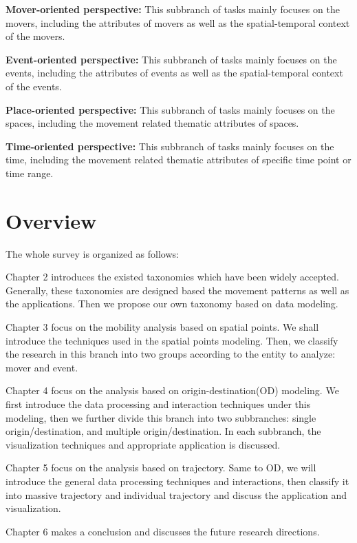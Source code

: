 \textbf{Mover-oriented perspective:} This subbranch of tasks mainly focuses on the movers, including the attributes of movers as well as the spatial-temporal context of the movers. 

\textbf{Event-oriented perspective:} This subbranch of tasks mainly focuses on the events, including the attributes of events as well as the spatial-temporal context of the events. 

\textbf{Place-oriented perspective:} This subbranch of tasks mainly focuses on the spaces, including the movement related thematic attributes of spaces. 

\textbf{Time-oriented perspective:} This subbranch of tasks mainly focuses on the time, including the movement related thematic attributes of specific time point or time range. 

\section{Overview}


The whole survey is organized as follows:


Chapter 2 introduces the existed taxonomies which have been widely accepted. Generally, these taxonomies are designed based the movement patterns as well as the applications. Then we propose our own taxonomy based on data modeling.

Chapter 3 focus on the mobility analysis based on spatial points. We shall introduce the techniques used in the spatial points modeling. Then, we classify the research in this branch into two groups according to the entity to analyze: mover and event. 

Chapter 4 focus on the analysis based on origin-destination(OD) modeling. We first introduce the data processing and interaction techniques under this modeling, then we further divide this branch into two subbranches: single origin/destination, and multiple origin/destination. In each subbranch, the visualization techniques and appropriate application is discussed.

Chapter 5 focus on the analysis based on trajectory. Same to OD, we will introduce the general data processing techniques and interactions, then classify it into massive trajectory and individual trajectory and discuss the application and visualization.

Chapter 6 makes a conclusion and discusses the future research directions.

